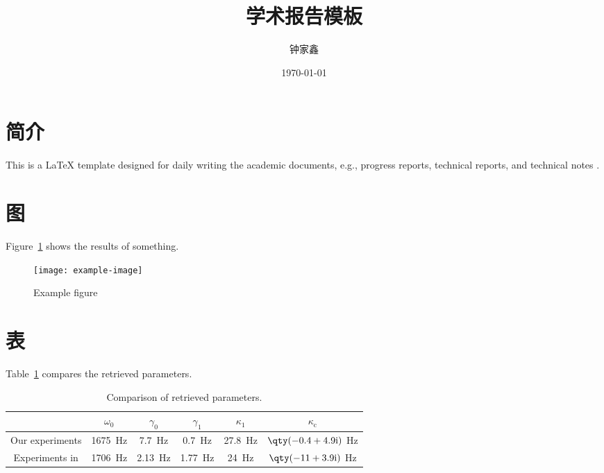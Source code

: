 \documentclass{article}
\title{\textbf{学术报告模板}}
\author{钟家鑫}
\date{\today}
\begin{document}
\maketitle
\thispagestyle{firststyle}

\section{简介}
This is a \LaTeX{} template designed for daily writing the academic documents, e.g., progress reports, technical reports, and technical notes \cite{Zhong2023ModalExpansionMethod}.

\lipsum[1]

\lipsum[2]

\lipsum[3]

\lipsum[4]

\lipsum[5]

\lipsum[6]

\section{图}
Figure~\ref{fig:39:f020390} shows the results of something.
\begin{figure}[!htb]
    \centering
    \texttt{[image: example-image]}
    \caption{Example figure}
    \label{fig:39:f020390}
\end{figure}

\section{表}
Table~\ref{tab:f20} compares the retrieved parameters.
\begin{table}[!htb]
    \centering
    \caption{Comparison of retrieved parameters.}
    \begin{tabular}{cccccc}
        \toprule
         & $\omega_0$
         & $\gamma_0$
         & $\gamma_1$
         & $\kappa_1$
         & $\kappa_\mathrm{c}$
        \\
        \midrule
        Our experiments
         &
        1675~Hz
         &
        7.7~Hz
         &
        0.7~Hz
         &
        27.8~Hz
         &
        $\qty(-0.4+4.9\mathrm{i})$ Hz \\
        Experiments in \cite{Zhang2021AcousticNonHermitianSkin}
         &
        1706~Hz
         &
        2.13~Hz
         &
        1.77~Hz
         &
        24~Hz
         &
        $\qty(-11+3.9\mathrm{i})$ Hz  \\
        \bottomrule
    \end{tabular}
    \label{tab:f20}
\end{table}
\end{document}
